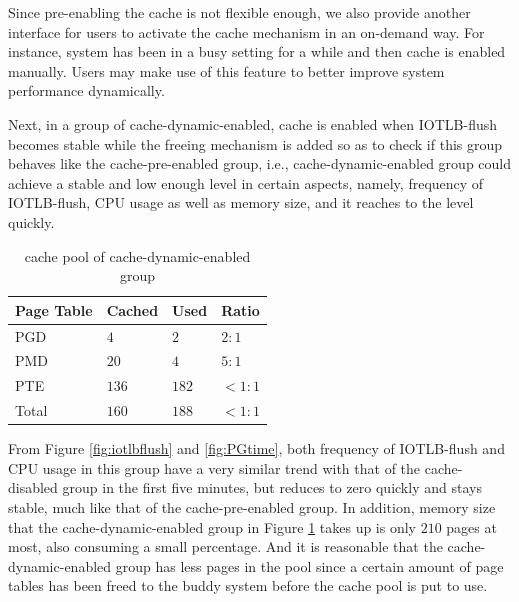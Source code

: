 Since pre-enabling the cache is not flexible enough, we also provide another interface for users to activate the cache mechanism in an on-demand way. For instance, system has been in a busy setting for a while and then cache is enabled manually. Users may make use of this feature to better improve system performance dynamically.

Next, in a group of cache-dynamic-enabled, cache is enabled when IOTLB-flush becomes stable while the freeing mechanism is added so as to check if this group behaves like the cache-pre-enabled group, i.e., cache-dynamic-enabled group could achieve a stable and low enough level in certain aspects, namely, frequency of IOTLB-flush, CPU usage as well as memory size, and it reaches to the level quickly.


\begin{table}[!ht]
\footnotesize
\begin{center}
\begin{tabular}{|l|l|l|l}
\hline
{\textbf{Page Table}} & {\textbf{Cached}} & {\textbf{Used}} & {\textbf{Ratio}} \\ \hline
PGD & $4$  & $2$   & $2:1$ \\ \hline
PMD & $20$ & $4$   & $5:1$ \\ \hline
PTE & $136$ & $182$ & $<1:1$ \\ \hline
Total & $160$ & $188$ & $<1:1$ \\ \hline
\end{tabular}
\end{center}
\caption{cache pool of cache-dynamic-enabled group}
\label{tab:dynPGpool}
\end{table}

From Figure \ref{fig:iotlbflush} and \ref{fig:PGtime}, both frequency of IOTLB-flush and CPU usage in this group have a very similar trend with that of the cache-disabled group in the first five minutes, but reduces to zero quickly and stays stable, much like that of the cache-pre-enabled group. In addition, memory size that the cache-dynamic-enabled group in Figure \ref{tab:dynPGpool} takes up is only $210$ pages at most, also consuming a small percentage. And it is reasonable that the cache-dynamic-enabled group has less pages in the pool since a certain amount of page tables has been freed to the buddy system before the cache pool is put to use.

